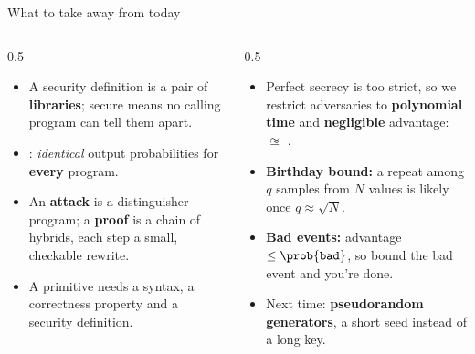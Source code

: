 \ifdefined\PRESENTATION\else\PassOptionsToClass{handout}{beamer}\fi\documentclass[aspectratio=169, lualatex]{beamer}
\begin{document}
\begin{frame}{What to take away from today}
	\begin{columns}[c]
		\begin{column}{0.5\textwidth}
			\begin{itemize}
				\item A security definition is a pair of \textbf{libraries}; secure means no calling program can tell them apart.
				\item {} \interchangeable{} : \textit{identical} output probabilities for \textbf{every} program.
				\item An \textbf{attack} is a distinguisher program; a \textbf{proof} is a chain of hybrids, each step a small, checkable rewrite.
				\item A primitive needs a syntax, a correctness property and a security definition.
			\end{itemize}
		\end{column}
		\begin{column}{0.5\textwidth}
			\begin{itemize}
				\item Perfect secrecy is too strict, so we restrict adversaries to \textbf{polynomial time} and \textbf{negligible} advantage:  $\approxeq$ .
				\item \textbf{Birthday bound:} a repeat among $q$ samples from $N$ values is likely once $q \approx \sqrt{N}$.
				\item \textbf{Bad events:} advantage $\leq \prob{\texttt{bad}}$, so bound the bad event and you're done.
				\item Next time: \textbf{pseudorandom generators}, a short seed instead of a long key.
			\end{itemize}
		\end{column}
	\end{columns}
\end{frame}

\begin{frame}[plain]
	\titlepage
\end{frame}
\end{document}
